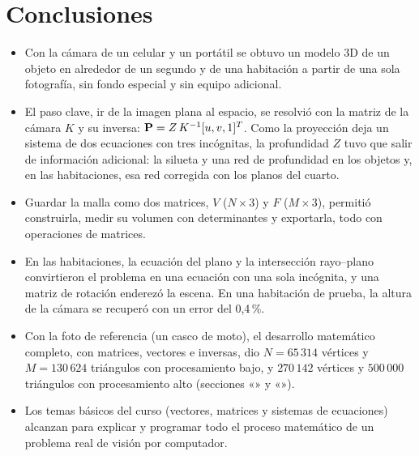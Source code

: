 \section{Conclusiones}

\begin{itemize}
  \item Con la cámara de un celular y un portátil se obtuvo un modelo 3D de un
        objeto en alrededor de un segundo y de una habitación a partir de una
        sola fotografía, sin fondo especial y sin equipo adicional.
  \item El paso clave, ir de la imagen plana al espacio, se resolvió con la
        matriz de la cámara $K$ y su inversa: $\mathbf{P}=Z\,K^{-1}[u,v,1]^{T}$.
        Como la proyección deja un sistema de dos ecuaciones con tres
        incógnitas, la profundidad $Z$ tuvo que salir de información adicional:
        la silueta y una red de profundidad en los objetos y, en las
        habitaciones, esa red corregida con los planos del cuarto.
  \item Guardar la malla como dos matrices, $V$ ($N\times3$) y $F$
        ($M\times3$), permitió construirla, medir su volumen con determinantes
        y exportarla, todo con operaciones de matrices.
  \item En las habitaciones, la ecuación del plano y la intersección
        rayo--plano convirtieron el problema en una ecuación con una sola
        incógnita, y una matriz de rotación enderezó la escena. En una
        habitación de prueba, la altura de la cámara se recuperó con un error
        del 0,4\,\%.
  \item Con la foto de referencia (un casco de moto), el desarrollo matemático
        completo, con matrices, vectores e inversas, dio $N=65\,314$ vértices y $M=130\,624$
        triángulos con procesamiento bajo, y $270\,142$ vértices y $500\,000$ triángulos con procesamiento alto
        (secciones «» y «»).
  \item Los temas básicos del curso (vectores, matrices y sistemas de
        ecuaciones) alcanzan para explicar y programar todo el proceso
        matemático de un problema real de visión por computador.
\end{itemize}

